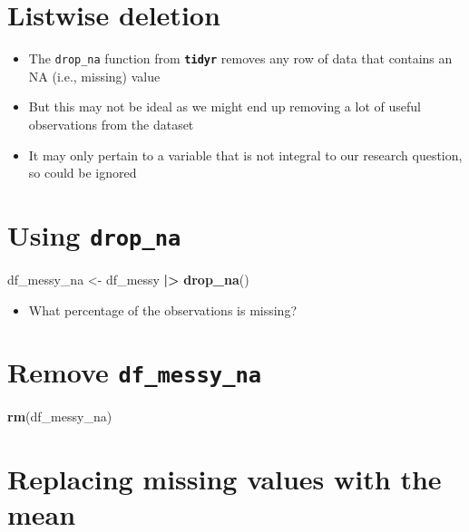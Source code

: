 \documentclass[
]{article}
\newenvironment{Shaded}{\begin{snugshade}}{\end{snugshade}}
\newcommand{\FunctionTok}[1]{\textcolor[rgb]{0.13,0.29,0.53}{\textbf{#1}}}
\newcommand{\NormalTok}[1]{#1}
\newcommand{\OtherTok}[1]{\textcolor[rgb]{0.56,0.35,0.01}{#1}}
\newcommand{\SpecialCharTok}[1]{\textcolor[rgb]{0.81,0.36,0.00}{\textbf{#1}}}
\providecommand{\tightlist}{%
  \setlength{\itemsep}{0pt}\setlength{\parskip}{0pt}}
\begin{document}
\hypertarget{listwise-deletion}{%
\section{Listwise deletion}\label{listwise-deletion}}

\begin{itemize}
\tightlist
\item
  The \texttt{drop\_na} function from \textbf{\texttt{tidyr}} removes
  any row of data that contains an NA (i.e., missing) value
\item
  But this may not be ideal as we might end up removing a lot of useful
  observations from the dataset
\item
  It may only pertain to a variable that is not integral to our research
  question, so could be ignored
\end{itemize}

\hypertarget{using-drop_na}{%
\section{\texorpdfstring{Using
\texttt{drop\_na}}{Using drop\_na}}\label{using-drop_na}}

\begin{Shaded}
\begin{Highlighting}[]
\NormalTok{df\_messy\_na }\OtherTok{\textless{}{-}}
\NormalTok{  df\_messy }\SpecialCharTok{|\textgreater{}}
  \FunctionTok{drop\_na}\NormalTok{()}
\end{Highlighting}
\end{Shaded}

\begin{itemize}
\tightlist
\item
  What percentage of the observations is missing?
\end{itemize}

\hypertarget{remove-df_messy_na}{%
\section{\texorpdfstring{Remove
\texttt{df\_messy\_na}}{Remove df\_messy\_na}}\label{remove-df_messy_na}}

\begin{Shaded}
\begin{Highlighting}[]
\FunctionTok{rm}\NormalTok{(df\_messy\_na)}
\end{Highlighting}
\end{Shaded}

\hypertarget{replacing-missing-values-with-the-mean}{%
\section{Replacing missing values with the
mean}\label{replacing-missing-values-with-the-mean}}
\end{document}
